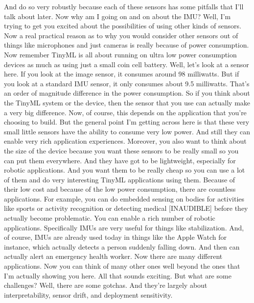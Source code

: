     And do so very robustly because each of these sensors
    has some pitfalls that I'll talk about later.
    Now why am I going on and on about the IMU?
    Well, I'm trying to get you excited about the possibilities of using
    other kinds of sensors.
    Now a real practical reason as to why you would consider other sensors out
    of things like microphones and just cameras
    is really because of power consumption.
    Now remember TinyML is all about running on ultra low power consumption devices
    as much as using just a small coin cell battery.
    Well, let's look at a sensor here.
    If you look at the image sensor, it consumes around 98 milliwatts.
    But if you look at a standard IMU sensor,
    it only consumes about 9.5 milliwatts.
    That's an order of magnitude difference in the power consumption.
    So if you think about the TinyML system or the device,
    then the sensor that you use can actually make a very big difference.
    Now, of course, this depends on the application
    that you're choosing to build.
    But the general point I'm getting across here
    is that these very small little sensors have the ability
    to consume very low power.
    And still they can enable very rich application experiences.
    Moreover, you also want to think about the size of the device
    because you want these sensors to be really small so you can put them
    everywhere.
    And they have got to be lightweight, especially for robotic applications.
    And you want them to be really cheap so you can use a lot of them
    and do very interesting TinyML applications using them.
    Because of their low cost and because of the low power consumption,
    there are countless applications.
    For example, you can do embedded sensing on bodies for activities like sports
    or activity recognition or detecting medical [INAUDIBLE] before they
    actually become problematic.
    You can enable a rich number of robotic applications.
    Specifically IMUs are very useful for things like stabilization.
    And, of course, IMUs are already used today in things like the Apple Watch
    for instance, which actually detects a person suddenly falling down.
    And then can actually alert an emergency health worker.
    Now there are many different applications.
    Now you can think of many other ones well beyond the ones
    that I'm actually showing you here.
    All that sounds exciting.
    But what are some challenges?
    Well, there are some gotchas.
    And they're largely about interpretability, sensor drift,
    and deployment sensitivity.
